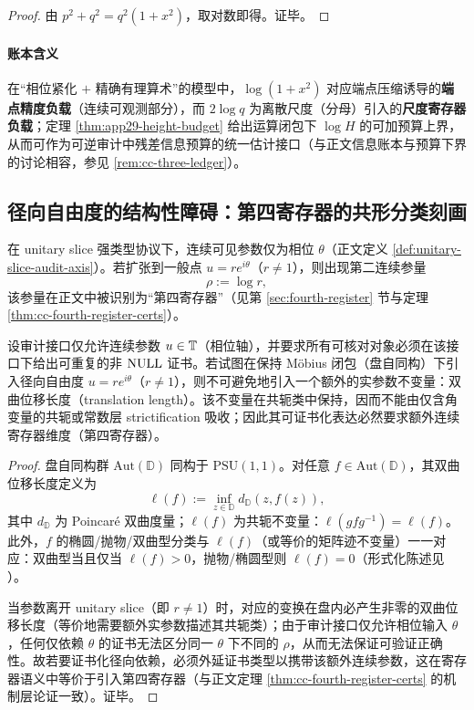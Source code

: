 \begin{proof}
由 $p^2+q^2=q^2(1+x^2)$，取对数即得。证毕。
\end{proof}

\paragraph{账本含义}
在“相位紧化 $+$ 精确有理算术”的模型中，$\log(1+x^2)$ 对应端点压缩诱导的\textbf{端点精度负载}（连续可观测部分），而 $2\log q$ 为离散尺度（分母）引入的\textbf{尺度寄存器负载}；定理 \ref{thm:app29-height-budget} 给出运算闭包下 $\log H$ 的可加预算上界，从而可作为可逆审计中残差信息预算的统一估计接口（与正文信息账本与预算下界的讨论相容，参见 \ref{rem:cc-three-ledger}）。

\subsection{径向自由度的结构性障碍：第四寄存器的共形分类刻画}\label{subsec:app29-radial}

在 unitary slice 强类型协议下，连续可见参数仅为相位 $\theta$（正文定义 \ref{def:unitary-slice-audit-axis}）。若扩张到一般点 $u=re^{i\theta}$（$r\neq 1$），则出现第二连续参量
$$
\rho:=\log r,
$$
该参量在正文中被识别为“第四寄存器”（见第 \ref{sec:fourth-register} 节与定理 \ref{thm:cc-fourth-register-certs}）。

\begin{theorem}\label{thm:app29-hyperbolic-invariant}
设审计接口仅允许连续参数 $u\in\mathbb{T}$（相位轴），并要求所有可核对对象必须在该接口下给出可重复的非 $\mathrm{NULL}$ 证书。若试图在保持 Möbius 闭包（盘自同构）下引入径向自由度 $u=re^{i\theta}$（$r\neq 1$），则不可避免地引入一个额外的实参数不变量：双曲位移长度（translation length）。该不变量在共轭类中保持，因而不能由仅含角变量的共轭或常数层 strictification 吸收；因此其可证书化表达必然要求额外连续寄存器维度（第四寄存器）。
\end{theorem}

\begin{proof}
盘自同构群 $\mathrm{Aut}(\mathbb{D})$ 同构于 $\mathrm{PSU}(1,1)$。对任意 $f\in\mathrm{Aut}(\mathbb{D})$，其双曲位移长度定义为
$$
\ell(f):=\inf_{z\in\mathbb{D}} d_{\mathbb{D}}(z,f(z)),
$$
其中 $d_{\mathbb{D}}$ 为 Poincar\'e 双曲度量；$\ell(f)$ 为共轭不变量：$\ell(gfg^{-1})=\ell(f)$。此外，$f$ 的椭圆/抛物/双曲型分类与 $\ell(f)$（或等价的矩阵迹不变量）一一对应：双曲型当且仅当 $\ell(f)>0$，抛物/椭圆型则 $\ell(f)=0$（形式化陈述见 \cite{SeriesHyperbolicNotes}）。
\par
当参数离开 unitary slice（即 $r\neq 1$）时，对应的变换在盘内必产生非零的双曲位移长度（等价地需要额外实参数描述其共轭类）；由于审计接口仅允许相位输入 $\theta$，任何仅依赖 $\theta$ 的证书无法区分同一 $\theta$ 下不同的 $\rho$，从而无法保证可验证正确性。故若要证书化径向依赖，必须外延证书类型以携带该额外连续参数，这在寄存器语义中等价于引入第四寄存器（与正文定理 \ref{thm:cc-fourth-register-certs} 的机制层论证一致）。证毕。
\end{proof}

